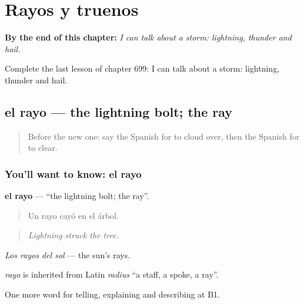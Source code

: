 
\chapter{Rayos y truenos}
\label{ch:es-rayos-y-truenos}

\begin{chapteropening}
\textbf{By the end of this chapter:} \emph{I can talk about a storm: lightning, thunder and hail.}

Complete the last lesson of chapter 699: I can talk about a storm: lightning, thunder and hail.
\end{chapteropening}

\section[el rayo]{el rayo — the lightning bolt; the ray}

\label{lesson:ES-C699-rayo}



\begin{quote}
Before the new one: say the Spanish for to cloud over, then the Spanish for to clear.
\end{quote}

\subsection*{You'll want to know: el rayo}
\textbf{el rayo} — \textquotedblleft{}the lightning bolt; the ray\textquotedblright{}.

\begin{quote}
Un rayo cayó en el árbol.
\end{quote}

\begin{quote}
\emph{Lightning struck the tree.}
\end{quote}

\emph{Los rayos del sol} — the sun’s rays.

\begin{cousinweb}
\emph{rayo} is inherited from Latin \emph{radius} \textquotedblleft{}a staff, a spoke, a ray\textquotedblright{}.
\end{cousinweb}

\begin{grammarlens}[title={What you've built}]
One more word for telling, explaining and describing at B1.
\end{grammarlens}

